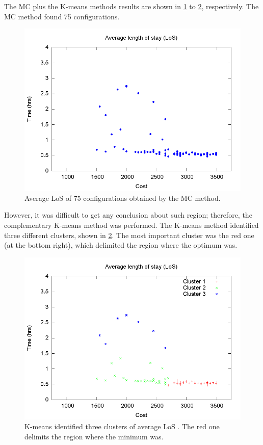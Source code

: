 \documentclass[11pt]{article} %
\begin{document}
The MC plus the K-means methods results are shown in \ref{subfig:mc4-1}
to \ref{subfig:km4-1}, respectively. The MC method found 75 configurations.
\begin{figure}[H]
\noindent \centering{}\includegraphics[width=0.95\columnwidth,height=0.23\paperheight]{figs4/v0/MC/MC-6400-602-25-69-25-75confs-LoS}\caption{Average LoS of 75 configurations obtained by the MC method. \label{subfig:mc4-1}}
\end{figure}
 However, it was difficult to get any conclusion about such region;
therefore, the complementary K-means method was performed. The K-means
method identified three different clusters, shown in \ref{subfig:km4-1}.
The most important cluster was the red one (at the bottom right),
which delimited the region where the optimum was. 
\begin{figure}[H]
\noindent \centering{}\includegraphics[width=0.95\columnwidth,height=0.23\paperheight]{figs4/v0/MC/K-means-6400-602-25-69-25-75-Cluster1-36_Cluster2-27_Cluster3-8}\caption{K-means identified three clusters of average LoS . The red one delimits
the region where the minimum was.\label{subfig:km4-1}}
\end{figure}

\end{document}
